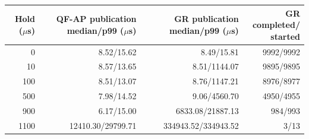 \begin{tabular}{@{}rrrr@{}}
\toprule
\shortstack{Hold\\($\mu$s)} & \shortstack{QF-AP publication\\median/p99 ($\mu$s)} & \shortstack{GR publication\\median/p99 ($\mu$s)} & \shortstack{GR completed/\\started} \\
\midrule
0 & 8.52/15.62 & 8.49/15.81 & 9992/9992 \\
10 & 8.57/13.65 & 8.51/1144.07 & 9895/9895 \\
100 & 8.51/13.07 & 8.76/1147.21 & 8976/8977 \\
500 & 7.98/14.52 & 9.06/4560.70 & 4950/4955 \\
900 & 6.17/15.00 & 6833.08/21887.13 & 984/993 \\
1100 & 12410.30/29799.71 & 334943.52/334943.52 & 3/13 \\
\bottomrule
\end{tabular}

